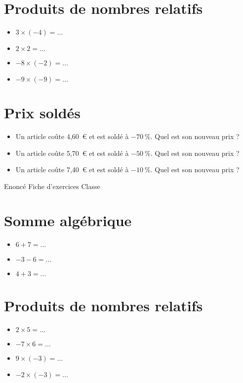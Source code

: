 \documentclass[a4paper,11pt,fleqn]{article}
\begin{document}
\section{Produits de nombres relatifs}
\begin{itemize}

  \item $3\times(-4)=\ldots$
  \item $2\times2=\ldots$
  \item $-8\times(-2)=\ldots$
  \item $-9\times(-9)=\ldots$
\end{itemize}


\section{Prix soldés}
\begin{itemize}

  \item Un article coûte 4,60~€ et est soldé à $-70~\%$. Quel est son nouveau prix ?
  \item Un article coûte 5,70~€ et est soldé à $-50~\%$. Quel est son nouveau prix ?
  \item Un article coûte 7,40~€ et est soldé à $-10~\%$. Quel est son nouveau prix ?
\end{itemize}
\newpage
\setcounter{exo}{0}
\setcounter{section}{0}
{Enoncé} \hfill {\huge Fiche d'exercices } \hfill {Classe}

\section{Somme algébrique}
\begin{itemize}

  \item $6 +7=\ldots$
  \item $-3 -6=\ldots$
  \item $4 +3=\ldots$
\end{itemize}


\section{Produits de nombres relatifs}
\begin{itemize}

  \item $2\times5=\ldots$
  \item $-7\times6=\ldots$
  \item $9\times(-3)=\ldots$
  \item $-2\times(-3)=\ldots$
\end{itemize}
\end{document}
